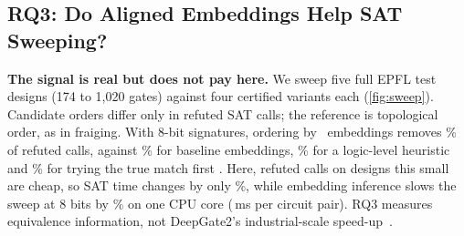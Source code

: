 \subsection{RQ3: Do Aligned Embeddings Help SAT Sweeping?}\label{sec:rq3}
\noindent\textbf{The signal is real but does not pay here.} We sweep five full EPFL test designs (174 to 1{,}020 gates) against four
certified variants each (\cref{fig:sweep}). Candidate orders differ only in refuted SAT
calls; the reference is topological order, as in fraiging. With 8-bit
signatures, ordering by \ours\ embeddings removes \SwOursEmbEight\% of refuted calls, against \SwBaseEmbEight\% for
baseline embeddings, \SwLevelEight\% for a logic-level heuristic and \SwTrueEight\% for trying the true match first%
. Here,
refuted calls on designs this small are cheap, so SAT time changes
by only \SwCpuSatTimeEight\%, while embedding inference slows the sweep at 8 bits by \SwCpuSlowEight\%
on one CPU core (\SwCpuEmbMs\,ms per circuit pair). RQ3 measures equivalence information, not
DeepGate2's industrial-scale speed-up~\cite{DBLP:conf/iccad/ShiPKLLHZYCX23}.


